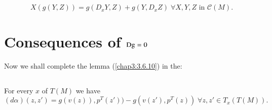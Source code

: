 \setcounter{subsection}{8}

\subsection{}\label{chap5:5.3.9}

\begin{coro*}
\begin{equation*}
X(g(Y,Z))=g(D_{x}Y,Z)+g(Y,D_{x}Z)\; \forall X,Y,Z\text{ \  in
  \ }\mathscr{C}(M).\tag{D.L.5} 
\end{equation*}
\end{coro*}

\section{Consequences of $\operatorname{Dg}=0$}\label{chap5:sec4}
\quad
Now we shall complete the lemma (\ref{chap3:3.6.10}) in the:

\subsection{}\label{chap5:prop5.4.1}

\begin{prop*}
For every $x$ of $T(M)$ we have 
$$
(d\alpha)(z,z')=g(v(z)),p^{T}(z'))-g(v(z'),p^{T}(z)) \; \forall
z,z'\in T_{x}(T(M)).  
$$
\end{prop*}

